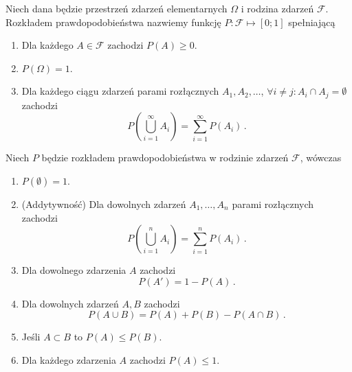 \documentclass{myclass}
\numberwithin{equation}{subsection}
\begin{document}
\begin{definition}
Niech dana będzie przestrzeń zdarzeń elementarnych \(\Omega\) i rodzina zdarzeń \(\mathcal{F}\).
Rozkładem prawdopodobieństwa nazwiemy funkcję \(P: \mathcal{F} \mapsto [0;1]\) spełniającą
\begin{enumerate}
    
    \item Dla każdego \(A \in \mathcal{F}\) zachodzi \(P(A) \geq 0\).
    
    \item \(P(\Omega) = 1\).
    
    \item Dla każdego ciągu zdarzeń parami rozłącznych \(A_1,A_2,\ldots\), \(\forall i \neq j : A_i
    \cap A_j = \emptyset\) zachodzi
    \begin{equation*}
        P\left(\bigcup_{i=1}^\infty A_i\right) = \sum_{i=1}^\infty P(A_i)\,.
    \end{equation*}

\end{enumerate}
\end{definition}

\begin{theorem}
Niech \(P\) będzie rozkładem prawdopodobieństwa w rodzinie zdarzeń \(\mathcal{F}\), wówczas

\begin{enumerate}
    
    \item \(P(\emptyset) = 1\).
    
    \item (Addytywność) Dla dowolnych zdarzeń \(A_1,\ldots,A_n\) parami rozłącznych zachodzi
    \begin{equation*}
        P\left(\bigcup_{i=1}^n A_i\right) = \sum_{i=1}^n P(A_i)\,.
    \end{equation*}

    \item Dla dowolnego zdarzenia \(A\) zachodzi
    \begin{equation*}
        P(A') = 1 - P(A)\,.
    \end{equation*}

    \item Dla dowolnych zdarzeń \(A, B\) zachodzi
    \begin{equation*}
        P(A \cup B) = P(A) + P(B) - P(A \cap B)\,.
    \end{equation*}

    \item Jeśli \(A \subset B\) to \(P(A) \leq P(B)\).

    \item Dla każdego zdarzenia \(A\) zachodzi \(P(A) \leq 1\).

\end{enumerate}
\end{theorem}
\end{document}
